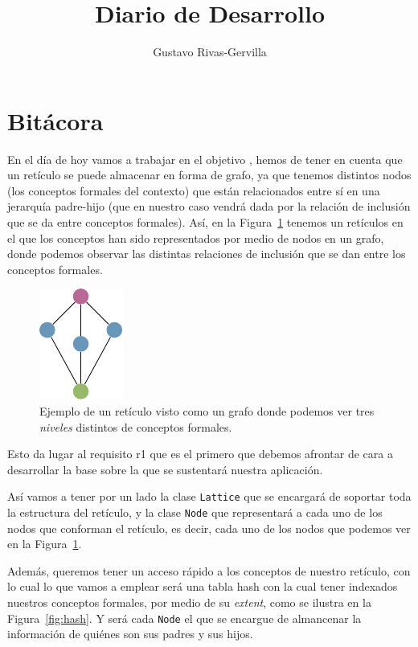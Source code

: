 \documentclass[
hue = 206,
sdrawing = 0.44,
bdrawing = 0.73,
stext = 0.45,
btext = 0.44,
sline = 0.46,
bline = 0.15]{grigerart}
\title{Diario de Desarrollo}
\author{Gustavo Rivas-Gervilla}
\begin{document}
\maketitle
\tableofcontents

\section*{Bitácora \label{sec:bitacora}}


En el día de hoy vamos a trabajar en el objetivo , hemos de tener en cuenta que un retículo se puede almacenar en forma de grafo, ya que tenemos distintos nodos (los conceptos formales del contexto) que están relacionados entre sí en una jerarquía padre-hijo (que en nuestro caso vendrá dada por la relación de inclusión que se da entre conceptos formales). Así, en la Figura~\ref{fig:graph} tenemos un retículos en el que los conceptos han sido representados por medio de nodos en un grafo, donde podemos observar las distintas relaciones de inclusión que se dan entre los conceptos formales.

\begin{figure}[ht]
  \centering
  \includegraphics[]{figures/lattice.pdf}
  \caption{\label{fig:graph} Ejemplo de un retículo visto como un grafo donde podemos ver tres \textit{niveles} distintos de conceptos formales.}
\end{figure}

Esto da lugar al requisito r1 que es el primero que debemos afrontar de cara a desarrollar la base sobre la que se sustentará nuestra aplicación.

Así vamos a tener por un lado la clase \texttt{Lattice} que se encargará de soportar toda la estructura del retículo, y la clase \texttt{Node} que representará a cada uno de los nodos que conforman el retículo, es decir, cada uno de los nodos que podemos ver en la Figura~\ref{fig:graph}.

Además, queremos tener un acceso rápido a los conceptos de nuestro retículo, con lo cual lo que vamos a emplear será una tabla hash con la cual tener indexados nuestros conceptos formales, por medio de su \textit{extent}, como se ilustra en la Figura~\ref{fig:hash}. Y será cada \texttt{Node} el que se encargue de almancenar la información de quiénes son sus padres y sus hijos.
\end{document}
